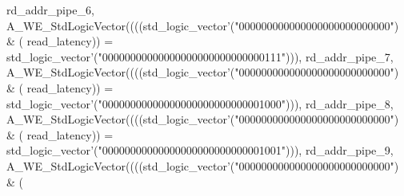 \begin{DoxyCode}
{      rd_addr_pipe_6}\textcolor{vhdlchar}{,} \textcolor{vhdlchar}{A\_WE\_StdLogicVector}\textcolor{vhdlchar}{(}\textcolor{vhdlchar}{(}\textcolor{vhdlchar}{(}\textcolor{vhdlchar}{(}\textcolor{comment}{std\_logic\_vector}\textcolor{vhdlchar}{'}\textcolor{vhdlchar}{(}\textcolor{vhdllogic}{"000000000000000000000000000"}\textcolor{vhdlchar}{)} \textcolor{vhdlchar}{&} \textcolor{vhdlchar}{(}\textcolor{vhdlchar}{
      read_latency}\textcolor{vhdlchar}{)}\textcolor{vhdlchar}{)} \textcolor{vhdlchar}{=} \textcolor{comment}{std\_logic\_vector}\textcolor{vhdlchar}{'}\textcolor{vhdlchar}{(}\textcolor{vhdllogic}{"00000000000000000000000000000111"}\textcolor{vhdlchar}{)}\textcolor{vhdlchar}{)}\textcolor{vhdlchar}{)}\textcolor{vhdlchar}{,} \textcolor{vhdlchar}{
      rd_addr_pipe_7}\textcolor{vhdlchar}{,} \textcolor{vhdlchar}{A\_WE\_StdLogicVector}\textcolor{vhdlchar}{(}\textcolor{vhdlchar}{(}\textcolor{vhdlchar}{(}\textcolor{vhdlchar}{(}\textcolor{comment}{std\_logic\_vector}\textcolor{vhdlchar}{'}\textcolor{vhdlchar}{(}\textcolor{vhdllogic}{"000000000000000000000000000"}\textcolor{vhdlchar}{)} \textcolor{vhdlchar}{&} \textcolor{vhdlchar}{(}\textcolor{vhdlchar}{
      read_latency}\textcolor{vhdlchar}{)}\textcolor{vhdlchar}{)} \textcolor{vhdlchar}{=} \textcolor{comment}{std\_logic\_vector}\textcolor{vhdlchar}{'}\textcolor{vhdlchar}{(}\textcolor{vhdllogic}{"00000000000000000000000000001000"}\textcolor{vhdlchar}{)}\textcolor{vhdlchar}{)}\textcolor{vhdlchar}{)}\textcolor{vhdlchar}{,} \textcolor{vhdlchar}{
      rd_addr_pipe_8}\textcolor{vhdlchar}{,} \textcolor{vhdlchar}{A\_WE\_StdLogicVector}\textcolor{vhdlchar}{(}\textcolor{vhdlchar}{(}\textcolor{vhdlchar}{(}\textcolor{vhdlchar}{(}\textcolor{comment}{std\_logic\_vector}\textcolor{vhdlchar}{'}\textcolor{vhdlchar}{(}\textcolor{vhdllogic}{"000000000000000000000000000"}\textcolor{vhdlchar}{)} \textcolor{vhdlchar}{&} \textcolor{vhdlchar}{(}\textcolor{vhdlchar}{
      read_latency}\textcolor{vhdlchar}{)}\textcolor{vhdlchar}{)} \textcolor{vhdlchar}{=} \textcolor{comment}{std\_logic\_vector}\textcolor{vhdlchar}{'}\textcolor{vhdlchar}{(}\textcolor{vhdllogic}{"00000000000000000000000000001001"}\textcolor{vhdlchar}{)}\textcolor{vhdlchar}{)}\textcolor{vhdlchar}{)}\textcolor{vhdlchar}{,} \textcolor{vhdlchar}{
      rd_addr_pipe_9}\textcolor{vhdlchar}{,} \textcolor{vhdlchar}{A\_WE\_StdLogicVector}\textcolor{vhdlchar}{(}\textcolor{vhdlchar}{(}\textcolor{vhdlchar}{(}\textcolor{vhdlchar}{(}\textcolor{comment}{std\_logic\_vector}\textcolor{vhdlchar}{'}\textcolor{vhdlchar}{(}\textcolor{vhdllogic}{"000000000000000000000000000"}\textcolor{vhdlchar}{)} \textcolor{vhdlchar}{&} \textcolor{vhdlchar}{(}\textcolor{vhdlchar}{
}
\end{DoxyCode}
